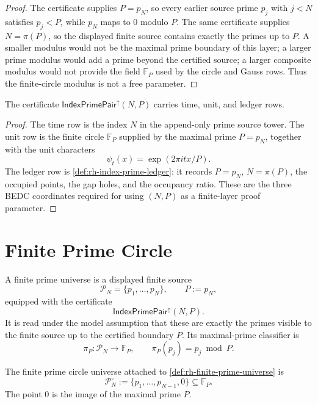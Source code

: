 \begin{proof}
The certificate supplies $P=p_N$, so every earlier source prime
$p_j$ with $j<N$ satisfies $p_j<P$, while $p_N$ maps to $0$ modulo $P$.
The same certificate supplies $N=\pi(P)$, so the displayed finite source
contains exactly the primes up to $P$.  A smaller modulus would not be
the maximal prime boundary of this layer; a larger prime modulus would
add a prime beyond the certified source; a larger composite modulus
would not provide the field $\mathbb F_P$ used by the circle and Gauss
rows.  Thus the finite-circle modulus is not a free parameter.
\end{proof}

\begin{theorem}
\label{thm:rh-index-prime-pair-has-bedc-rows}
The certificate $\mathsf{IndexPrimePair}^{\uparrow}(N,P)$ carries time,
unit, and ledger rows.
\end{theorem}

\begin{proof}
The time row is the index $N$ in the append-only prime source tower.
The unit row is the finite circle $\mathbb F_P$ supplied by the maximal
prime $P=p_N$, together with the unit characters
$$
\psi_t(x)=\exp(2\pi i tx/P).
$$
The ledger row is \autoref{def:rh-index-prime-ledger}: it records
$P=p_N$, $N=\pi(P)$, the occupied points, the gap holes, and the
occupancy ratio.  These are the three BEDC coordinates required for
using $(N,P)$ as a finite-layer proof parameter.
\end{proof}

\section{Finite Prime Circle}
\label{sec:rh-finite-prime-circle-universe-circle}

\begin{definition}
\label{def:rh-finite-prime-universe}
A finite prime universe is a displayed finite source
$$
\mathcal P_N=\{p_1,\ldots,p_N\},
\qquad
P:=p_N,
$$
equipped with the certificate
$$
\mathsf{IndexPrimePair}^{\uparrow}(N,P).
$$
It is read under the model assumption that these are exactly the primes
visible to the finite source up to the certified boundary $P$.  Its
maximal-prime classifier is
$$
\pi_P:\mathcal P_N\to\mathbb F_P,
\qquad
\pi_P(p_j)=p_j\bmod P.
$$
\end{definition}

\begin{definition}
\label{def:rh-finite-prime-circle-universe}
The finite prime circle universe attached to
\autoref{def:rh-finite-prime-universe} is
$$
\mathcal P_N^\circ
:=
\{p_1,\ldots,p_{N-1},0\}
\subseteq
\mathbb F_P.
$$
The point $0$ is the image of the maximal prime $P$.
\end{definition}

